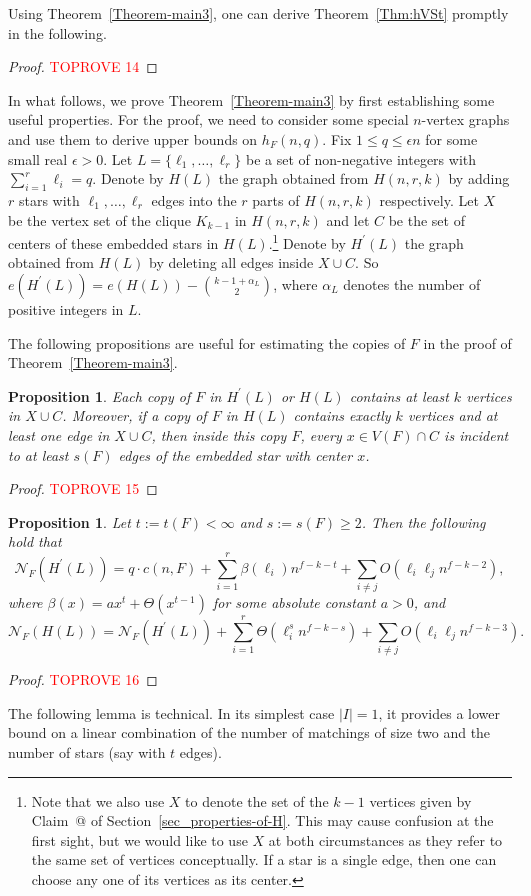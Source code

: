 \documentclass[10pt]{article}
\makeatletter
\newtheorem{proposition}[theorem]{Proposition}
\newcommand*{\rom}[1]{\expandafter\@slowromancap\romannumeral #1@}
\makeatother
\begin{document}
Using Theorem~\ref{Theorem-main3}, one can derive Theorem~\ref{Thm:hVSt} promptly in the following.

\begin{proof}\textcolor{red}{TOPROVE 14}\end{proof}


In what follows, we prove Theorem~\ref{Theorem-main3} by first establishing some useful properties.
For the proof, we need to consider some special $n$-vertex graphs and use them to derive upper bounds on $h_F(n,q)$.
Fix $1\leq q\leq \epsilon n$ for some small real $\epsilon>0$. Let $L=\{\ell_1, \ldots ,\ell_r\}$ be a set of non-negative integers with $\sum_{i=1}^{r}\ell_i=q$.
Denote by $H(L)$ the graph obtained from $H(n,r,k)$ by adding $r$ stars with $\ell_1,\ldots,\ell_r$ edges into the $r$ parts of $H(n,r,k)$ respectively.
Let $X$ be the vertex set of the clique $K_{k-1}$ in $H(n,r,k)$ and let $C$ be the set of centers of these embedded stars in $H(L)$.\footnote{Note that we also use $X$ to denote the set of the $k-1$ vertices given by Claim~\rom{1} of Section~\ref{sec_properties-of-H}. This may cause confusion at the first sight, but we would like to use $X$ at both circumstances as they refer to the same set of vertices conceptually. If a star is a single edge, then one can choose any one of its vertices as its center.}
Denote by $H^\prime(L)$ the graph obtained from $H(L)$ by deleting all edges inside $X\cup C$.
So $e(H^\prime(L))=e(H(L))-{k-1+\alpha_L \choose 2}$, where $\alpha_L$ denotes the number of positive integers in $L$.

The following propositions are useful for estimating the copies of $F$ in the proof of Theorem~\ref{Theorem-main3}.

\begin{proposition}\label{ob 1}
Each copy of $F$ in $H^\prime(L)$ or $H(L)$ contains at least $k$ vertices in $X\cup C$.
Moreover, if a copy of $F$ in $H(L)$ contains exactly $k$ vertices and at least one edge in $X\cup C$,
then inside this copy $F$, every $x\in V(F)\cap C$ is incident to at least $s(F)$ edges of the embedded star with center $x$.
\end{proposition}
\begin{proof}\textcolor{red}{TOPROVE 15}\end{proof}


\begin{proposition}\label{ob 3}
Let $t:=t(F)<\infty$ and $s:=s(F)\geq 2$. Then the following hold that
$$\mathcal{N}_F(H^\prime(L))=q\cdot c(n,F)+ \sum_{i=1}^{r} \beta(\ell_i)n^{f-k-t} +\sum_{i\neq j}O(\ell_i\ell_jn^{f-k-2}),$$
where $\beta(x)=ax^t+\Theta(x^{t-1})$ for some absolute constant $a>0$, and
$$\mathcal{N}_F(H(L))=\mathcal{N}_F(H^\prime(L))+ \sum_{i=1}^{r} \Theta (\ell_i^s n^{f-k-s})+\sum_{i\neq j}O(\ell_i\ell_jn^{f-k-3}).$$
\end{proposition}
\begin{proof}\textcolor{red}{TOPROVE 16}\end{proof}
The following lemma is technical.
In its simplest case $|I|=1$, it provides a lower bound on a linear combination of the number of matchings of size two and the number of stars (say with $t$ edges). 
\end{document}
